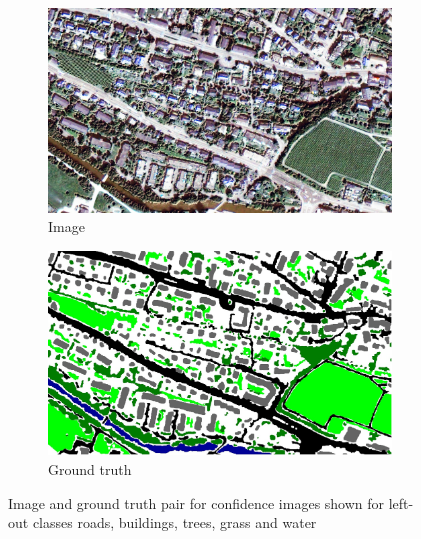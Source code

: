 \documentclass[10pt]{article}
\begin{document}
\begin{figure}[H]
	\centering
	\begin{subfigure}{.42\textwidth}
		\includegraphics[width=\textwidth]{Im_18}
		\caption{Image}
	\end{subfigure}
	\begin{subfigure}{.42\textwidth}
		\includegraphics[width=\textwidth]{GT_18}
		\caption{Ground truth}
	\end{subfigure}
	\caption{Image and ground truth pair for confidence images shown for left-out classes roads, buildings, trees, grass and water}
\end{figure}
\end{document}
